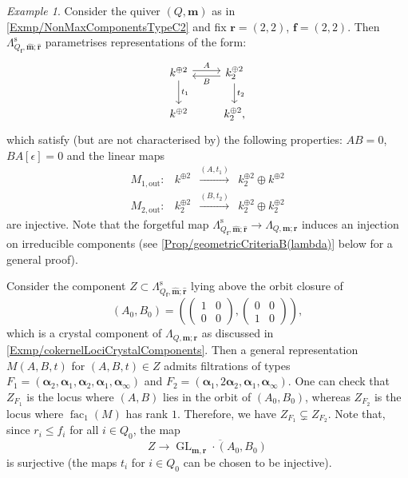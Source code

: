 \documentclass[a4paper,12pt]{article}
\theoremstyle{definition}
\theoremstyle{plain}
\theoremstyle{remark}
\newtheorem{example}[definition]{Example}
\DeclareMathOperator{\fac}{fac}
\DeclareMathOperator{\GL}{GL}
\newcommand{\st}{\mathrm{s}}
\newcommand\bfalpha{\bm{\alpha}}
\newcommand\bff{\mathbf{f}}
\newcommand\bfm{\mathbf{m}}
\newcommand\bfr{\mathbf{r}}
\begin{document}
\begin{example}
Consider the quiver $(Q,\bfm)$ as in \cref{Exmp/NonMaxComponentsTypeC2} and fix $\bfr=(2,2)$, $\bff=(2,2)$. Then $\Lambda_{Q_\bff,\widehat{\bfm};\widehat{\bfr}}^\st$ parametrises representations of the form:
\[
\begin{tikzcd}
k^{\oplus 2}\ar[r,"A",shift left]\ar[d,"t_1"] & k_2^{\oplus 2} \ar[l,"B", shift left]\ar[d,"t_2"] \\
k^{\oplus 2} & k_2^{\oplus 2},
\end{tikzcd}
\]
which satisfy (but are not characterised by) the following properties: $AB=0$, $BA[\epsilon]=0$ and the linear maps
\[
\begin{array}{cccc}
M_{1,\mathrm{out}}: & k^{\oplus 2} & \overset{(A,t_1)}{\longrightarrow} & k_2^{\oplus 2}\oplus k^{\oplus 2} \\
M_{2,\mathrm{out}}: & k_2^{\oplus 2} & \overset{(B,t_2)}{\longrightarrow} & k_2^{\oplus 2}\oplus k_2^{\oplus 2}
\end{array}
\]
are injective. Note that the forgetful map $\Lambda_{Q_\bff,\widehat{\bfm};\widehat{\bfr}}^\st\rightarrow\Lambda_{Q,\bfm;\bfr}$ induces an injection on irreducible components (see \cref{Prop/geometricCriteriaB(lambda)} below for a general proof).

Consider the component $Z\subset\Lambda_{Q_\bff,\widehat{\bfm};\widehat{\bfr}}^\st$ lying above the orbit closure of
\[
(A_0,B_0)=((\begin{smallmatrix}1 & 0 \\ 0 & 0\end{smallmatrix}),(\begin{smallmatrix}0 & 0 \\ 1 & 0\end{smallmatrix})),
\]
which is a crystal component of $\Lambda_{Q,\bfm;\bfr}$ as discussed in \cref{Exmp/cokernelLociCrystalComponents}. Then a general representation $M(A,B,t)$ for $ (A,B,t)\in Z$ admits filtrations of types $F_1=(\bfalpha_2,\bfalpha_1,\bfalpha_2,\bfalpha_1,\bfalpha_\infty)$ and $F_2=(\bfalpha_1,2\bfalpha_2,\bfalpha_1,\bfalpha_\infty)$. One can check that $Z_{F_1}$ is the locus where $(A,B)$ lies in the orbit of $(A_0,B_0)$, whereas $Z_{F_2}$ is the locus where $\fac_1(M)$ has rank $1$. Therefore, we have $Z_{F_1}\subsetneq Z_{F_2}$. Note that, since $r_i\leq f_i$ for all $i\in Q_0$, the map
\[
Z\rightarrow\overline{\GL_{\bfm,\bfr}\cdot (A_0,B_0)}
\]
is surjective (the maps $t_i$ for $ i\in Q_0$ can be chosen to be injective).


\end{example}
\end{document}

